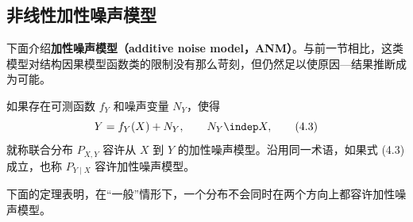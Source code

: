 \subsection{非线性加性噪声模型}

下面介绍\textbf{加性噪声模型（additive noise model，ANM）}。与前一节相比，这类模型对结构因果模型函数类的限制没有那么苛刻，但仍然足以使原因—结果推断成为可能。

\begin{definition}[加性噪声模型]
如果存在可测函数 $f_Y$ 和噪声变量 $N_Y$，使得
\begin{equation}
 Y=f_Y(X)+N_Y,\qquad N_Y\indep X,
 \tag{4.3}
\end{equation}
就称联合分布 $P_{X,Y}$ 容许从 $X$ 到 $Y$ 的加性噪声模型。沿用同一术语，如果式 (4.3) 成立，也称 $P_{Y\mid X}$ 容许加性噪声模型。
\end{definition}

下面的定理表明，在“一般”情形下，一个分布不会同时在两个方向上都容许加性噪声模型。

